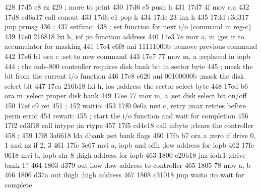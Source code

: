 428      17d5 c8                   rz
429                       ;        more to print
430      17d6 e5                   push     h
431      17d7 4f                   mov      c,a
432      17d8 cd6a17               call     conout
433      17db e1                   pop      h
434      17dc 23                   inx      h
435      17dd c3d317               jmp      prmsg
436                       ;
437                       setfunc:
438                       ;        set function for next i/o (command in reg-c)
439      17e0 216818               lxi      h, iof     ;io function address
440      17e3 7e                   mov      a, m       ;get it to accumulator for masking
441      17e4 e6f8                 ani      11111000b  ;remove previous command
442      17e6 b1                   ora      c          ;set to new command
443      17e7 77                   mov      m, a       ;replaced in iopb
444                       ;        the mds-800 controller requires disk bank bit in sector byte
445                       ;        mask the bit from the current i/o function
446      17e8 e620                 ani      00100000b        ;mask the disk select bit
447      17ea 216b18               lxi      h, ios           ;address the sector select byte
448      17ed b6                   ora      m                ;select proper disk bank
449      17ee 77                   mov      m, a             ;set disk select bit on/off
450      17ef c9                   ret
451                       ;
452                       waitio:
453      17f0 0e0a                 mvi      c, retry   ;max retries before perm error
454                       rewait:
455                       ;        start the i/o function and wait for completion
456      17f2 cd3f18               call     intype     ;in rtype
457      17f5 cd4c18               call     inbyte     ;clears the controller
458                       ;
459      17f8 3a6618               lda      dbank            ;set bank flags
460      17fb b7                   ora      a                ;zero if drive 0, 1 and nz if 2, 3
461      17fc 3e67                 mvi      a, iopb and offh ;low address for iopb
462      17fe 0618                 mvi      b, iopb shr 8    ;high address for iopb
463      1800 c20b18               jnz      iodr1      ;drive bank 1?
464      1803 d379                 out      ilow             ;low address to controller
465      1805 78                   mov      a, b
466      1806 d37a                 out      ihigh      ;high address
467      1808 c31018               jmp      waito            ;to wait for complete
